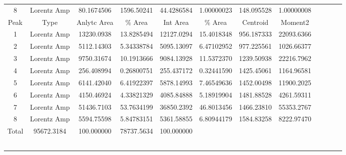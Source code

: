 \begin{table}[!h]
{\begin{tabular}{ccccccccllll}
8 & Lorentz Amp & 80.1674506 & 1596.50241 & 44.4286584 & 1.00000023 & 148.095528 & 1.00000008 &  &  &  &  \\ \cline{1-8}
Peak & Type & Anlytc Area & \% Area & Int Area & \% Area & Centroid & Moment2 &  &  &  &  \\ \cline{1-8}
1 & Lorentz Amp & 13230.0938 & 13.8285494 & 12127.0294 & 15.4018348 & 956.187333 & 22093.6366 &  &  &  &  \\
2 & Lorentz Amp & 5112.14303 & 5.34338784 & 5095.13097 & 6.47102952 & 977.225561 & 1026.66377 &  &  &  &  \\
3 & Lorentz Amp & 9750.31674 & 10.1913666 & 9084.13928 & 11.5372370 & 1239.50938 & 22216.7962 &  &  &  &  \\
4 & Lorentz Amp & 256.408994 & 0.26800751 & 255.437172 & 0.32441590 & 1425.45061 & 1164.96581 &  &  &  &  \\
5 & Lorentz Amp & 6141.42040 & 6.41922397 & 5878.14993 & 7.46549636 & 1452.00498 & 11900.2025 &  &  &  &  \\
6 & Lorentz Amp & 4150.46924 & 4.33821329 & 4085.84888 & 5.18919904 & 1481.88528 & 4261.59311 &  &  &  &  \\
7 & Lorentz Amp & 51436.7103 & 53.7634199 & 36850.2392 & 46.8013456 & 1466.23810 & 55353.2767 &  &  &  &  \\
8 & Lorentz Amp & 5594.75598 & 5.84783151 & 5361.58855 & 6.80944179 & 1584.83258 & 8222.97470 &  &  &  &  \\
Total & 95672.3184 & 100.000000 & 78737.5634 & 100.000000 &  &  &  &  &  &  &  \\
\multicolumn{1}{l}{} & \multicolumn{1}{l}{} & \multicolumn{1}{l}{} & \multicolumn{1}{l}{} & \multicolumn{1}{l}{} & \multicolumn{1}{l}{} & \multicolumn{1}{l}{} & \multicolumn{1}{l}{} &  &  &  &  \\
\multicolumn{1}{l}{} & \multicolumn{1}{l}{} & \multicolumn{1}{l}{} & \multicolumn{1}{l}{} & \multicolumn{1}{l}{} & \multicolumn{1}{l}{} & \multicolumn{1}{l}{} & \multicolumn{1}{l}{} &  &  &  &  \\
\multicolumn{1}{l}{} & \multicolumn{1}{l}{} & \multicolumn{1}{l}{} & \multicolumn{1}{l}{} & \multicolumn{1}{l}{} & \multicolumn{1}{l}{} & \multicolumn{1}{l}{} & \multicolumn{1}{l}{} &  &  &  &  \\
\multicolumn{1}{l}{} & \multicolumn{1}{l}{} & \multicolumn{1}{l}{} & \multicolumn{1}{l}{} & \multicolumn{1}{l}{} & \multicolumn{1}{l}{} & \multicolumn{1}{l}{} & \multicolumn{1}{l}{} &  &  &  &  \\
\multicolumn{1}{l}{} & \multicolumn{1}{l}{} & \multicolumn{1}{l}{} & \multicolumn{1}{l}{} & \multicolumn{1}{l}{} & \multicolumn{1}{l}{} & \multicolumn{1}{l}{} & \multicolumn{1}{l}{} &  &  &  &  \\

\end{tabular}}
\end{table}
